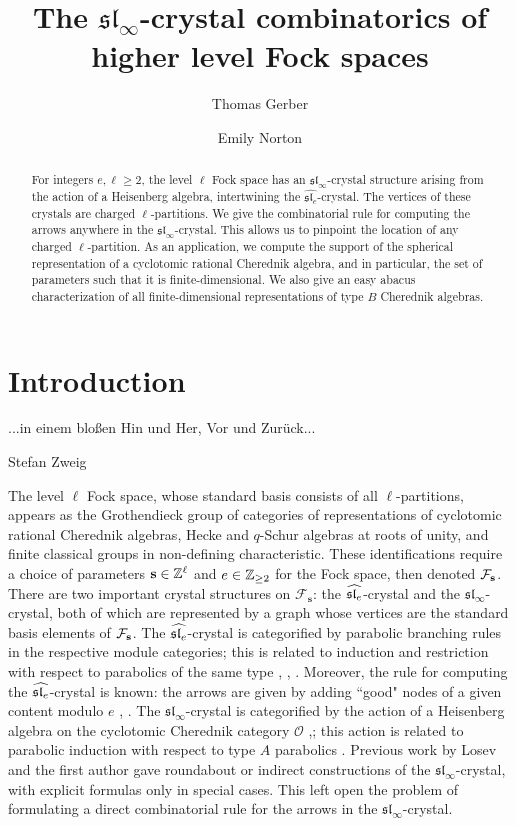 \documentclass[12pt]{amsart}
\title{The $\mathfrak{sl}_\infty$-crystal combinatorics of higher level Fock spaces}
\author{Thomas Gerber}
\author{Emily Norton}
\numberwithin{equation}{section}
\theoremstyle{definition}
\newcommand{\oh}{\mathcal{O}}
\newcommand{\slinf}{\mathfrak{sl}_\infty}
\newcommand{\mbs}{\mathbf{s}}
\begin{document}
\begin{abstract}
For integers $e,\ell\geq 2$, the level $\ell$ Fock space has an $\mathfrak{sl}_\infty$-crystal structure arising from 
the action of a Heisenberg algebra, 
intertwining the $\widehat{\mathfrak{sl}_e}$-crystal. 
The vertices of these crystals are charged $\ell$-partitions. 
We give the combinatorial rule for computing the arrows anywhere in the $\mathfrak{sl}_\infty$-crystal.
This allows us to pinpoint the location of any charged $\ell$-partition.
As an application, we compute the support of the spherical representation of a cyclotomic rational Cherednik algebra, and in particular, 
the set of parameters such that it is finite-dimensional. We also give an easy abacus characterization of all finite-dimensional representations of type $B$ Cherednik algebras.
\end{abstract}

\maketitle

\tableofcontents

\sloppy


\markright{COMBINATORICS OF THE $\slinf$-CRYSTAL}


\section*{Introduction}
\epigraph{...in einem blo\ss en Hin und Her, Vor und Zur\"{u}ck...}{Stefan Zweig}


The level $\ell$ Fock space,
whose standard basis consists of all $\ell$-partitions,
appears as the Grothendieck group of categories of representations of cyclotomic rational Cherednik algebras, Hecke and $q$-Schur algebras at roots of unity, and finite classical groups in non-defining characteristic. 
These identifications require a choice of parameters $\mathbf{s}\in\mathbb{Z}^\ell$ and $e\in\mathbb{Z}_{\geq 2}$ for the Fock space, then denoted $\mathcal{F}_{\mathbf{s}}$.
There are two important crystal structures on $\mathcal{F}_\mbs$: the $\widehat{\mathfrak{sl}_e}$-crystal and the $\slinf$-crystal,
both of which are represented by a graph whose vertices are the standard basis elements of $\mathcal{F}_{\mathbf{s}}$.
The $\widehat{\mathfrak{sl}_e}$-crystal is categorified by parabolic branching rules in the respective module categories;
this is related to induction and restriction with respect to parabolics of the same type \cite{Ariki2007}, \cite{Shan2011}, \cite{DVV}.
Moreover, the rule for computing the $\widehat{\mathfrak{sl}_e}$-crystal is known: the arrows are given by adding ``good" nodes of a given content modulo $e$ \cite{JMMO1991}, \cite{FLOTW1999}. 
The $\slinf$-crystal is categorified by the action of a Heisenberg algebra on the cyclotomic Cherednik category $\oh$ \cite{ShanVasserot2012},\cite{Losev2015}; 
this action is related to parabolic induction with respect to type $A$ parabolics \cite{ShanVasserot2012}.
Previous work by Losev \cite{Losev2015} and the first author \cite{Gerber2016} gave roundabout or indirect 
constructions of the $\slinf$-crystal, with explicit formulas only in special cases. 
This left open the problem of formulating a direct combinatorial rule for the arrows in the $\slinf$-crystal.
\end{document}
